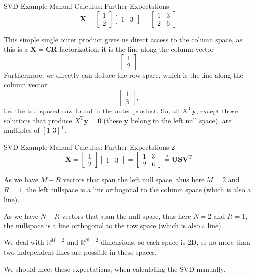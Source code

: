\documentclass[mathserif, aspectratio=1610]{intbeamer}
\begin{document}
\begin{frame}[t]{SVD Example Manual Calculus: Further Expectations}
$$\bm{X} =
\begin{bmatrix}
1\\2
\end{bmatrix}
\begin{bmatrix}
1 & 3
\end{bmatrix}
=
\begin{bmatrix}
1 & 3\\
2 & 6
\end{bmatrix}
$$

This simple single outer product gives us direct access to the column space, as this is a $\bm{X}=\bm{C}\bm{R}$ factorization; it is the line along the column vector
$$
\begin{bmatrix}
1\\2
\end{bmatrix}
$$
Furthermore, we directly can deduce the row space, which is the line along the
column vector
$$
\begin{bmatrix}
1\\3
\end{bmatrix},
$$
i.e. the transposed row found in the outer product. So, all $X^\mathrm{T} \bm{y}$,
except those solutions that produce $X^\mathrm{T} \bm{y} = \bm{0}$ (these $\bm{y}$
belong to the left null space), are multiples of $[1, 3]^\mathrm{T}$.


\end{frame}



\begin{frame}[t]{SVD Example Manual Calculus: Further Expectations 2}
$$\bm{X} =
\begin{bmatrix}
1\\2
\end{bmatrix}
\begin{bmatrix}
1 & 3
\end{bmatrix}
=
\begin{bmatrix}
1 & 3\\
2 & 6
\end{bmatrix}
\stackrel{?}{=}
\bm{U}\bm{S}\bm{V}^\mathrm{T}
$$

As we have $M-R$ vectors that span the left null space, thus here $M=2$ and $R=1$,
the left nullspace is a line orthogonal to the column space (which is also a line).

As we have $N-R$ vectors that span the null space, thus here $N=2$ and $R=1$,
the nullspace is a line orthogonal to the row space (which is also a line).

We deal with $\mathbb{R}^{M=2}$ and $\mathbb{R}^{N=2}$ dimensions, so each space
is 2D, so no more than two independent lines are possible in these spaces.

We should meet these expectations, when calculating the SVD manually.

\end{frame}
\end{document}
